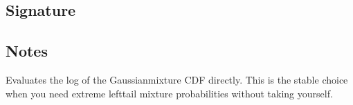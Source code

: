 \documentclass[letterpaper,10pt,english]{sphinxmanual}
\begin{document}
\subsection{Signature}
\label{\detokenize{api_reference:id34}}
\begin{sphinxVerbatim}[commandchars=\\\{\}]
\end{sphinxVerbatim}


\subsection{Notes}
\label{\detokenize{api_reference:id35}}
\sphinxAtStartPar
Evaluates the log of the Gaussian\sphinxhyphen{}mixture CDF directly. This is the stable choice when you need extreme left\sphinxhyphen{}tail mixture probabilities without taking  yourself.
\end{document}
